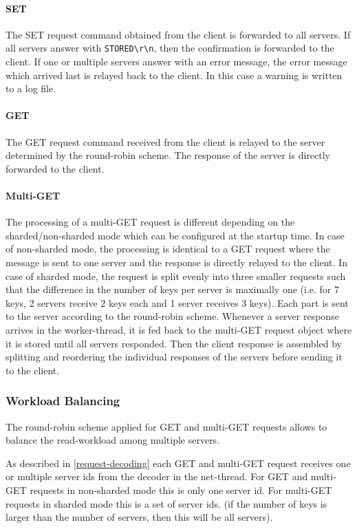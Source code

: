\documentclass[report.tex]{subfiles}
\begin{document}
\paragraph{SET} The SET request command obtained from the client is forwarded to all servers. If all servers answer with \texttt{STORED\textbackslash r\textbackslash n}, then the confirmation is forwarded to the client. 
If one or multiple servers answer with an error message, the error message which arrived last is relayed back to the client. 
In this case a warning is written to a log file.

\paragraph{GET} The GET request command received from the client is relayed to the server determined by the round-robin scheme.
The response of the server is directly forwarded to the client.

\paragraph{Multi-GET} The processing of a multi-GET request is different depending on the sharded/non-sharded mode which can be configured at the startup time. In case of non-sharded mode, the processing is identical to a GET request where the message is sent to one server and the response is directly relayed to the client. In case of sharded mode, the request is split evenly into three smaller requests such that the difference in the number of keys per server is maximally one (i.e. for 7 keys, 2 servers receive 2 keys each and 1 server receives 3 keys).
Each part is sent to the server according to the round-robin scheme. Whenever a server response arrives in the worker-thread, it is fed back to the multi-GET request object where it is stored until all servers responded. Then the client response is assembled by splitting and reordering the individual responses of the servers before sending it to the client.

\subsubsection{Workload Balancing}\label{workload-balancing}
The round-robin scheme applied for GET and multi-GET requests allows to balance the read-workload among multiple servers.

As described in \ref{request-decoding} each GET and multi-GET request receives one or multiple server ids from the decoder in the net-thread.
For GET and multi-GET requests in non-sharded mode this is only one server id. For multi-GET requests in sharded mode this is a set of server ids. (if the number of keys is larger than the number of servers, then this will be all servers).
\end{document}
